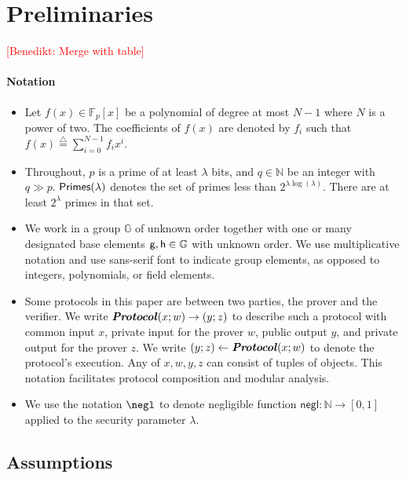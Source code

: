 \documentclass{article}
\theoremstyle{definition}
\newcommand{\benedikt}[1]{{\textcolor{red}{[Benedikt: #1]}}}
\newcommand{\ben}[1]{{\textcolor{green}{[Ben: #1]}}}
\newcommand{\benedikt}[1]{}
\newcommand{\ben}[1]{}
\begin{document}
\section{Preliminaries}
\benedikt{Merge with table}
\paragraph{Notation}
\begin{itemize}
\item Let $f(x) \in \mathbb{F}_p[x]$ be a polynomial of degree at most $N-1$ where $N$ is a power of two. The coefficients of $f(x)$ are denoted by $f_i$ such that $f(x) \stackrel{\triangle}{=} \sum_{i=0}^{N-1} f_i x^i$.
\item Throughout, $p$ is a prime of at least $\lambda$ bits, and $q \in \mathbb{N}$ be an integer with $q \gg p$.  $\textsf{Primes}(\lambda)$ denotes the set of primes less than $2^{\lambda \log(\lambda)}$. There are at least $2^\lambda$ primes in that set.
\item We work in a group $\mathbb{G}$ of unknown order together with one or many designated base elements $\mathsf{g}, \mathsf{h} \in \mathbb{G}$ with unknown order. 
We use multiplicative notation and use \textsf{sans-serif} font to indicate group elements, as opposed to integers, polynomials, or field elements.
\item Some protocols in this paper are between two parties, the prover and the verifier. We write $\boldsymbol{\it Protocol}(x;w) \rightarrow (y;z)$ to describe such a protocol with common input $x$, private input for the prover $w$, public output $y$, and private output for the prover $z$. We write $(y;z) \gets \boldsymbol{\it Protocol}(x;w)$ to denote the protocol's execution. Any of $x,w,y,z$ can consist of tuples of objects. This notation facilitates protocol composition and modular analysis.

\item We use the notation $\negl$ to denote negligible function $\textsf{negl}: \mathbb{N} \rightarrow [0,1]$ applied to the security parameter $\lambda$. 
\end{itemize}

\subsection{Assumptions}
\end{document}

